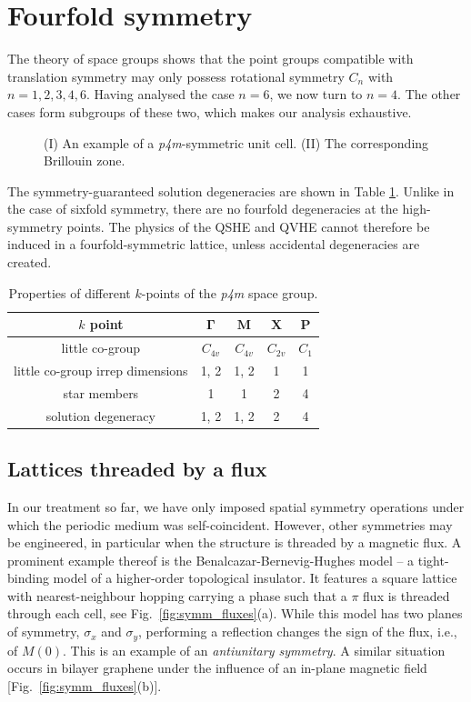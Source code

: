 \section{Fourfold symmetry} \label{sec:symm_fourfold}

The theory of space groups shows that the point groups compatible with translation symmetry may only possess rotational symmetry $C_n$ with $n = 1,2,3,4,6$. Having analysed the case $n=6$, we now turn to $n=4$. The other cases form subgroups of these two, which makes our analysis exhaustive. 

\begin{figure} [h!]
	\centering
	
	\caption{(I) An example of a \textit{p4m}-symmetric unit cell. (II) The corresponding Brillouin zone.}
	\label{fig:symm_p4m}
\end{figure}


The symmetry-guaranteed solution degeneracies are shown in Table \ref{table:symm_p4m_degs}. Unlike in the case of sixfold symmetry, there are no fourfold degeneracies at the high-symmetry points. The physics of the QSHE and QVHE cannot therefore be induced in a fourfold-symmetric lattice, unless accidental degeneracies are created. 

\begin{table} [h!]
	\centering
	\caption{Properties of different $k$-points of the \textit{p4m} space group. }
	\label{table:symm_p4m_degs}
	\begin{tabular}{ c c c c c }
		$k$ point & $\boldsymbol{\Gamma}$ & $\boldsymbol{M}$ & $\boldsymbol{X}$ & $\boldsymbol{P}$  \\ \hline
		little co-group & $C_{4v}$ & $C_{4v}$ & $C_{2v}$ & $C_1$ \\
		little co-group irrep dimensions & 1, 2 & 1, 2 & 1 & 1 \\
		star members & 1 & 1 & 2 & 4 \\
		solution degeneracy & 1, 2 & 1, 2 & 2 & 4 \\
	\end{tabular}
\end{table}

\subsection{Lattices threaded by a flux} \label{sec:symm_fluxes}

In our treatment so far, we have only imposed spatial symmetry operations under which the periodic medium was self-coincident. However, other symmetries may be engineered, in particular when the structure is threaded by a magnetic flux. A prominent example thereof is the Benalcazar-Bernevig-Hughes model -- a tight-binding model of a higher-order topological insulator. It features a square lattice with nearest-neighbour hopping carrying a phase such that a $\pi$ flux is threaded through each cell, see Fig.~\ref{fig:symm_fluxes}(a). While this model has two planes of symmetry, $\sigma_x$ and $\sigma_y$, performing a reflection changes the sign of the flux, i.e., of $M(0)$. This is an example of an \textit{antiunitary symmetry}. A similar situation occurs in bilayer graphene under the influence of an in-plane magnetic field [Fig.~\ref{fig:symm_fluxes}(b)]. 

